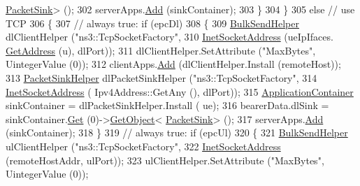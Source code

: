 \begin{DoxyCode}
      \hyperlink{classns3_1_1PacketSink}{PacketSink}> ();
302                       serverApps.\hyperlink{classns3_1_1ApplicationContainer_ad09ab1a1ad5849d518d5f4c262e38152}{Add} (sinkContainer);  
303                     \}            
304                 \}                    
305               \textcolor{keywordflow}{else} \textcolor{comment}{// use TCP}
306                 \{
307                   \textcolor{comment}{// always true: if (epcDl)}
308                     \{
309                       \hyperlink{classns3_1_1BulkSendHelper}{BulkSendHelper} dlClientHelper (\textcolor{stringliteral}{"ns3::TcpSocketFactory"},
310                                                      \hyperlink{classns3_1_1InetSocketAddress}{InetSocketAddress} (ueIpIfaces.
      \hyperlink{classns3_1_1Ipv4InterfaceContainer_ae63208dcd222be986822937ee4aa828c}{GetAddress} (u), dlPort));
311                       dlClientHelper.SetAttribute (\textcolor{stringliteral}{"MaxBytes"}, UintegerValue (0));
312                       clientApps.\hyperlink{classns3_1_1ApplicationContainer_ad09ab1a1ad5849d518d5f4c262e38152}{Add} (dlClientHelper.Install (remoteHost));
313                       \hyperlink{classns3_1_1PacketSinkHelper}{PacketSinkHelper} dlPacketSinkHelper (\textcolor{stringliteral}{"ns3::TcpSocketFactory"}, 
314                                                            \hyperlink{classns3_1_1InetSocketAddress}{InetSocketAddress} (
      Ipv4Address::GetAny (), dlPort));
315                       \hyperlink{classns3_1_1ApplicationContainer}{ApplicationContainer} sinkContainer = dlPacketSinkHelper.Install (
      ue);
316                       bearerData.dlSink = sinkContainer.\hyperlink{classns3_1_1ApplicationContainer_a9e565807abd4213a56566a7ccd8d7509}{Get} (0)->\hyperlink{classns3_1_1Object_a13e18c00017096c8381eb651d5bd0783}{GetObject}<
      \hyperlink{classns3_1_1PacketSink}{PacketSink}> ();
317                       serverApps.\hyperlink{classns3_1_1ApplicationContainer_ad09ab1a1ad5849d518d5f4c262e38152}{Add} (sinkContainer);
318                     \}
319                   \textcolor{comment}{// always true: if (epcUl)}
320                     \{     
321                       \hyperlink{classns3_1_1BulkSendHelper}{BulkSendHelper} ulClientHelper (\textcolor{stringliteral}{"ns3::TcpSocketFactory"},
322                                                      \hyperlink{classns3_1_1InetSocketAddress}{InetSocketAddress} (remoteHostAddr, 
      ulPort));
323                       ulClientHelper.SetAttribute (\textcolor{stringliteral}{"MaxBytes"}, UintegerValue (0));                  

\end{DoxyCode}

